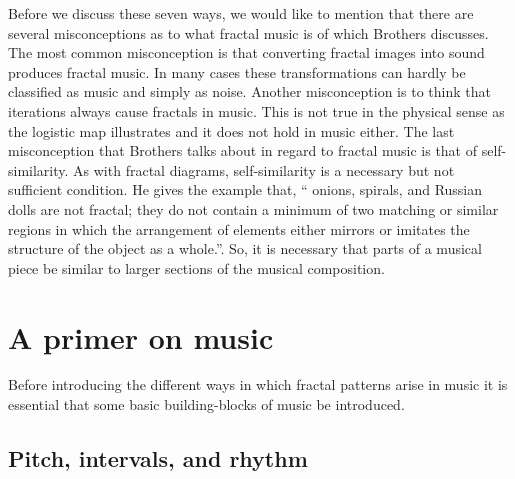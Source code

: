 \documentclass{article}
\begin{document}
Before we discuss these seven ways, we would like to mention that there are
several misconceptions as to what fractal music is of which Brothers discusses\cite{5}.
The most common misconception is that converting fractal images into sound
produces fractal music. In many cases these transformations can hardly be
classified as music and simply as noise. Another misconception is to think that
iterations always cause fractals in music. This is not true in the physical
sense as the logistic map illustrates\cite{5} and it does not hold in music either.
The last misconception that Brothers talks about in regard to fractal music is
that of self-similarity. As with fractal diagrams, self-similarity is a
necessary but not sufficient condition\cite{5}. He gives the example that, “ onions,
spirals, and Russian dolls are not fractal; they do not contain a minimum of two
matching or similar regions in which the arrangement of elements either mirrors
or imitates the structure of the object as a whole.”\cite{5}. So, it is necessary
that parts of a musical piece be similar to larger sections of the musical
composition.

\section{A primer on music}

Before introducing the different ways in which fractal patterns arise in music
it is essential that some basic building-blocks of music be introduced.

\subsection{Pitch, intervals, and rhythm}
\end{document}
